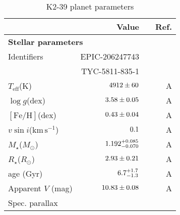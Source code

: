 \documentclass[preprint2]{aastex6}
\newcommand{\Mstar}{\ensuremath{M_{\star}}\xspace}
\newcommand{\Rstar}{\ensuremath{R_{\star}}\xspace}
\newcommand{\fe}{\ensuremath{\mathrm{[Fe/H]}}\xspace}
\newcommand{\teff}{$T_{\mathrm{eff}}$\xspace}
\newcommand{\logg}{\ensuremath{\log g}\xspace}
\newcommand{\vsini}{\ensuremath{v \sin i}\xspace}
\newcommand{\kms}{\ensuremath{\mathrm{km}\,\mathrm{s}^{-1}}\xspace}
\newcommand{\Rsun}{\ensuremath{R_{\odot}}\xspace }
\newcommand{\Msun}{\ensuremath{M_{\odot}}\xspace}
\begin{document}
{\renewcommand{\arraystretch}{0.9}
\begin{table*}
\centering
\caption{K2-39 planet parameters}
\begin{tabular}{lrrr}
\hline
\hline
                          & {\rm Value }  &  & {\rm Ref.}  \\
\hline
    \multicolumn{4}{l}{{\bf Stellar parameters}} \\
    Identifiers         & EPIC-206247743              &  & \\
                        & TYC-5811-835-1              &  & \\
    \teff (K)           & $\val{K2-39-star}{teff}$    &  & A \\
    \logg (dex)         & $\val{K2-39-star}{logg}$    &  & A \\
    \fe (dex)           & $\val{K2-39-star}{fe}$      &  & A \\
    \vsini (\kms)       & $\val{K2-39-star}{vsini}$   &  & A \\
    \Mstar (\Msun)      & $\val{K2-39-star}{mass}$    &  & A \\
    \Rstar (\Rsun)      & $\val{K2-39-star}{radius}$  &  & A \\
    age (Gyr)           & $\val{K2-39-star}{agegyr}$  &  & A \\
    Apparent $V$ (mag)  & $\val{K2-39-star}{vmag}$    &  & A \\
    Spec. parallax      & 


\end{tabular}
\end{table*}}
\end{document}
